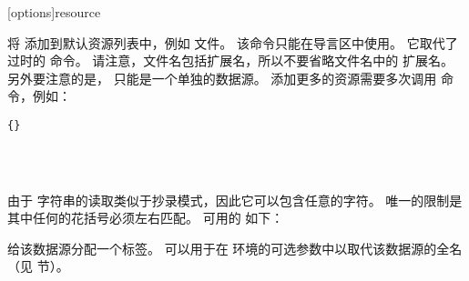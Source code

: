 \begin{ltxsyntax}

[options]{resource}


将  添加到默认资源列表中，例如  文件。
该命令只能在导言区中使用。
它取代了过时的  命令。
请注意，文件名包括扩展名，所以不要省略文件名中的  扩展名。
另外要注意的是， 只能是一个单独的数据源。
添加更多的资源需要多次调用  命令，例如：

\begin{lstlisting}[style=latex]{}




\end{lstlisting}
%
由于  字符串的读取类似于抄录模式，因此它可以包含任意的字符。
唯一的限制是其中任何的花括号必须左右匹配。
可用的  如下：

\begin{optionlist*}



给该数据源分配一个标签。
 可以用于在  环境的可选参数中以取代该数据源的全名
（见  节）。




\end{optionlist*}
\end{ltxsyntax}
